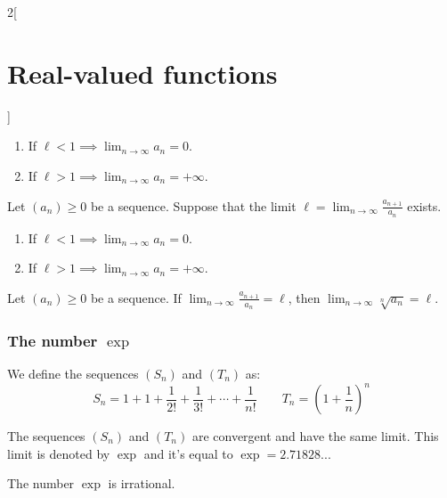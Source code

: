 \documentclass[../../../main.tex]{subfiles}
\begin{document}
\begin{multicols}{2}[\section{Real-valued functions}]
\begin{theorem}
\begin{enumerate}
      \item If $\displaystyle \ell<1\implies\lim_{n\to\infty}a_n=0$.
      \item If $\displaystyle \ell>1\implies\lim_{n\to\infty}a_n=+\infty$.
    \end{enumerate}
  \end{theorem}
  \begin{theorem}
    Let $(a_n)\geq 0$ be a sequence. Suppose that the limit $\displaystyle \ell=\lim_{n\to\infty}\frac{a_{n+1}}{a_n}$ exists.
    \begin{enumerate}
      \item If $\displaystyle \ell<1\implies\lim_{n\to\infty}a_n=0$.
      \item If $\displaystyle \ell>1\implies\lim_{n\to\infty}a_n=+\infty$.
    \end{enumerate}
  \end{theorem}
  \begin{theorem}
    Let $(a_n)\geq 0$ be a sequence. If $\displaystyle \lim_{n\to\infty}\frac{a_{n+1}}{a_n}=\ell$, then $\displaystyle \lim_{n\to\infty}\sqrt[n]{a_n}=\ell$.
  \end{theorem}
  \subsubsection{The number $\exp{}$}
  \begin{definition}
    We define the sequences $(S_n)$ and $(T_n)$ as:
    $$S_n=1+1+\frac{1}{2!}+\frac{1}{3!}+\cdots+\frac{1}{n!}\qquad T_n={\left(1+\frac{1}{n}\right)}^n$$
  \end{definition}
  \begin{proposition}
    The sequences $(S_n)$ and $(T_n)$ are convergent and have the same limit. This limit is denoted by $\exp{}$ and it's equal to $\exp{}=2.71828...$
  \end{proposition}
  \begin{theorem}
    The number $\exp{}$ is irrational.
  \end{theorem}

\end{multicols}
\end{document}
